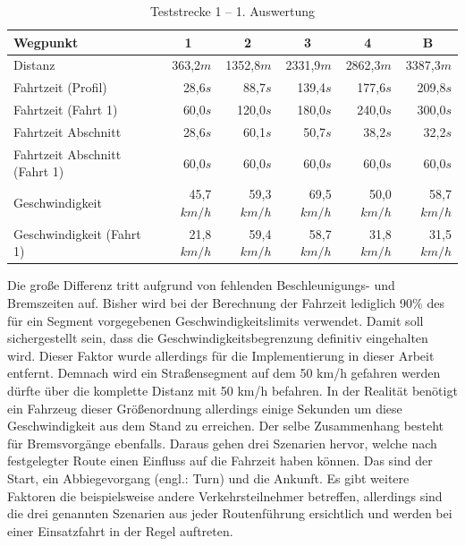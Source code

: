 \begin{table}[htb]
\centering
\small
\caption{Teststrecke 1 -- 1. Auswertung}
\label{tab:driveinit}
\begin{tabular}{|l|r|r|r|r|r|}
\hline
Wegpunkt                               & \multicolumn{1}{c|}{1} & \multicolumn{1}{c|}{2} & \multicolumn{1}{c|}{3} & \multicolumn{1}{c|}{4} & \multicolumn{1}{c|}{B}      \\ \hline
Distanz                                & 363,2$m$                & 1352,8$m$               & 2331,9$m$               & 2862,3$m$               & 3387,3$m$               \\ \hline
Fahrtzeit (Profil)                     & 28,6$s$                 & 88,7$s$                 & 139,4$s$                & 177,6$s$                & 209,8$s$                \\ \hline
Fahrtzeit (Fahrt 1)                  & 60,0$s$                 & 120,0$s$                & 180,0$s$                & 240,0$s$                & 300,0$s$                \\ \hline
Fahrtzeit Abschnitt                    & 28,6$s$                 & 60,1$s$                 & 50,7$s$                 & 38,2$s$                 & 32,2$s$                 \\ \hline
Fahrtzeit Abschnitt (Fahrt 1)        & 60,0$s$                 & 60,0$s$                 & 60,0$s$                 & 60,0$s$                 & 60,0$s$                 \\ \hline
Geschwindigkeit                        & 45,7$km/h$              & 59,3$km/h$              & 69,5$km/h$              & 50,0$km/h$              & 58,7$km/h$              \\ \hline
Geschwindigkeit (Fahrt 1)            & 21,8$km/h$              & 59,4$km/h$              & 58,7$km/h$              & 31,8$km/h$              & 31,5$km/h$              \\ \hline
\end{tabular}
\end{table}

Die große Differenz tritt aufgrund von fehlenden Beschleunigungs- und Bremszeiten auf.
Bisher wird bei der Berechnung der Fahrzeit lediglich 90$\%$ des für ein Segment vorgegebenen Geschwindigkeitslimits verwendet.
Damit soll sichergestellt sein, dass die Geschwindigkeitsbegrenzung definitiv eingehalten wird.
Dieser Faktor wurde allerdings für die Implementierung in dieser Arbeit entfernt.
Demnach wird ein Straßensegment auf dem 50 km/h gefahren werden dürfte über die komplette Distanz mit 50 km/h befahren.
In der Realität benötigt ein Fahrzeug dieser Größenordnung allerdings einige Sekunden um diese Geschwindigkeit aus dem Stand zu erreichen.
Der selbe Zusammenhang besteht für Bremsvorgänge ebenfalls.
Daraus gehen drei Szenarien hervor, welche nach festgelegter Route einen Einfluss auf die Fahrzeit haben können.
Das sind der Start, ein Abbiegevorgang (engl.: Turn) und die Ankunft.
Es gibt weitere Faktoren die beispielsweise andere Verkehrsteilnehmer betreffen, allerdings sind die drei genannten Szenarien aus jeder Routenführung ersichtlich und werden bei einer Einsatzfahrt in der Regel auftreten.

